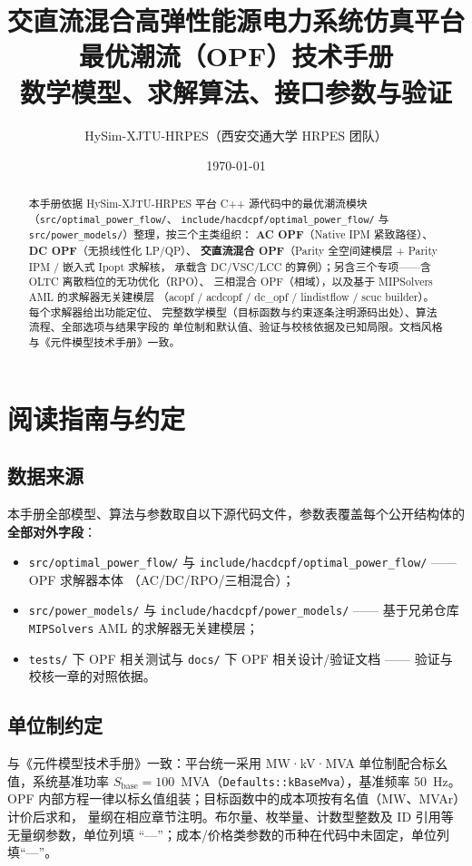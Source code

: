 \documentclass[UTF8,fontset=windows,a4paper,11pt]{ctexart}
\title{\textbf{交直流混合高弹性能源电力系统仿真平台}\\[0.5em]
       {\Large 最优潮流（OPF）技术手册}\\[0.3em]
       {\large 数学模型、求解算法、接口参数与验证}}
\author{HySim-XJTU-HRPES（西安交通大学 HRPES 团队）}
\date{\today}
\begin{document}
\maketitle
\begin{abstract}
\noindent 本手册依据 HySim-XJTU-HRPES 平台 C++ 源代码中的最优潮流模块
（\texttt{src/\allowbreak optimal\_\allowbreak power\_\allowbreak flow/}、
\texttt{include/\allowbreak hacdcpf/\allowbreak optimal\_\allowbreak power\_\allowbreak flow/}
与 \texttt{src/\allowbreak power\_\allowbreak models/}）整理，按三个主类组织：
\textbf{AC OPF}（Native IPM 紧致路径）、\textbf{DC OPF}（无损线性化 LP/QP）、
\textbf{交直流混合 OPF}（Parity 全空间建模层 + Parity IPM / 嵌入式 Ipopt 求解核，
承载含 DC/VSC/LCC 的算例）；另含三个专项——含 OLTC 离散档位的无功优化（RPO）、
三相混合 OPF（相域），以及基于 MIPSolvers AML 的求解器无关建模层
（acopf / acdcopf / dc\_opf / lindistflow / scuc builder）。每个求解器给出功能定位、
完整数学模型（目标函数与约束逐条注明源码出处）、算法流程、全部选项与结果字段的
单位制和默认值、验证与校核依据及已知局限。文档风格与《元件模型技术手册》一致。
\end{abstract}

\tableofcontents
\newpage

\section{阅读指南与约定}

\subsection{数据来源}
本手册全部模型、算法与参数取自以下源代码文件，参数表覆盖每个公开结构体的
\textbf{全部对外字段}：
\begin{itemize}
  \item \texttt{src/optimal\_power\_flow/} 与
        \texttt{include/hacdcpf/optimal\_power\_flow/} —— OPF 求解器本体
        （AC/DC/RPO/三相混合）；
  \item \texttt{src/power\_models/} 与 \texttt{include/hacdcpf/power\_models/} ——
        基于兄弟仓库 \texttt{MIPSolvers} AML 的求解器无关建模层；
  \item \texttt{tests/} 下 OPF 相关测试与 \texttt{docs/} 下 OPF 相关设计/验证文档
        —— 验证与校核一章的对照依据。
\end{itemize}

\subsection{单位制约定}
与《元件模型技术手册》一致：平台统一采用 MW·kV·MVA 单位制配合标幺值，系统基准功率
$S_{\mathrm{base}}=100$~MVA（\texttt{Defaults::kBaseMva}），基准频率 50~Hz。
OPF 内部方程一律以标幺值组装；目标函数中的成本项按有名值（MW、MVAr）计价后求和，
量纲在相应章节注明。布尔量、枚举量、计数型整数及 ID 引用等无量纲参数，单位列填
“—”；成本/价格类参数的币种在代码中未固定，单位列填“—”。
\end{document}

